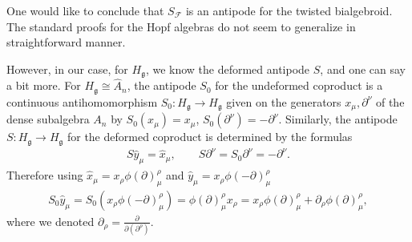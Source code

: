 \documentclass[pdftex]{sigma}
\def\gg{\mathfrak{g}}
\numberwithin{equation}{section}
\begin{document}
One would like to conclude that $S_{\mathcal{F}}$ is an antipode for the twisted bialgebroid. The standard proofs for the Hopf algebras do not seem to generalize in straightforward manner.

However, in our case, for $H_\gg$, we know the deformed antipode $S$, and one can say a bit more. For $H_\gg\cong\hat{A}_n$, the antipode $S_0$ for the undeformed coproduct is a continuous antihomomorphism $S_0\colon H_\gg\to H_\gg$ given on the generators $x_\mu,\partial^\nu$ of the dense subalgebra $A_n$ by $S_0(x_\mu)=x_\mu$, $S_0(\partial^\nu) = -\partial^\nu$. Similarly, the antipode $S\colon H_\gg\to H_\gg$ for the deformed coproduct is determined by the formulas
\begin{gather*}
S\hat{y}_\mu = \hat{x}_\mu,\qquad S\partial^\nu = S_0\partial^\nu = -\partial^\nu.
\end{gather*}
 Therefore using $\hat{x}_\mu = x_\rho \phi(\partial)^\rho_\mu$ and $\hat{y}_\mu = x_\rho \phi(-\partial)^\rho_\mu$
\begin{gather*}
S_0 \hat{y}_\mu = S_0(x_\rho \phi(-\partial)^\rho_\mu) = \phi(\partial)^\rho_\mu x_\rho = x_\rho\phi(\partial)^\rho_\mu + \partial_\rho\phi(\partial)^\rho_\mu,
\end{gather*}
where we denoted $\partial_\rho = \frac{\partial}{\partial(\partial^\rho)}$.
\end{document}
